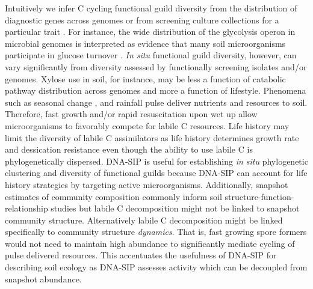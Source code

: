 Intuitively we infer C cycling functional guild diversity from the distribution
of diagnostic genes across genomes \citep{Berlemont2013} or from screening
culture collections for a particular trait \citep{Martiny2013}. For
instance, the wide distribution of the glycolysis operon in microbial
genomes is interpreted as evidence that many soil microorganisms
participate in glucose turnover \citep{McGuire2010}. \textit{In situ}
functional guild diversity, however, can vary significantly from diversity
assessed by functionally screening isolates and/or genomes. Xylose use in soil,
for instance, may be less a function of catabolic pathway distribution across
genomes and more a function of lifestyle. Phenomena such as seasonal change
\citep{Schmidt2007}, and rainfall \citep{Placella2012} pulse deliver nutrients
and resources to soil. Therefore, fast growth and/or rapid resuscitation upon
wet up \citep{Placella2012} allow microorganisms to favorably compete for
labile C resources. Life history may limit the diversity of labile
C assimilators as life history determines growth rate and dessication
resistance even though the ability to use labile C is phylogenetically
dispersed. DNA-SIP is useful for establishing \textit{in situ} phylogenetic
clustering and diversity of functional guilds because DNA-SIP can account for
life history strategies by targeting active microorganisms. Additionally,
snapshot estimates of community composition commonly inform soil
structure-function-relationship studies \citep{Fierer2007} but labile
C decomposition might not be linked to snapshot community structure.
Alternatively labile C decomposition might be linked specifically to community
structure \textit{dynamics}. That is, fast growing spore formers would not need
to maintain high abundance to significantly mediate cycling of pulse delivered
resources. This accentuates the usefulness of DNA-SIP for describing soil
ecology as DNA-SIP assesses activity which can be decoupled from snapshot
abundance.

